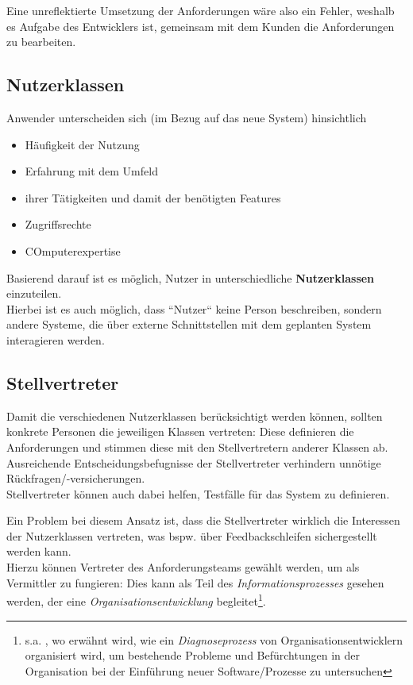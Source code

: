 \noindent
Eine unreflektierte Umsetzung der Anforderungen wäre also ein Fehler, weshalb es Aufgabe des Entwicklers ist, gemeinsam mit dem Kunden die Anforderungen zu bearbeiten.

\subsection*{Nutzerklassen}
Anwender unterscheiden sich (im Bezug auf das neue System) hinsichtlich

\begin{itemize}
    \item Häufigkeit der Nutzung
    \item Erfahrung mit dem Umfeld
    \item ihrer Tätigkeiten und damit der benötigten Features
    \item Zugriffsrechte
    \item COmputerexpertise
\end{itemize}

\noindent
Basierend darauf ist es möglich, Nutzer in unterschiedliche \textbf{Nutzerklassen} einzuteilen.\\
Hierbei ist es auch möglich, dass ``Nutzer`` keine Person beschreiben, sondern andere Systeme, die über externe Schnittstellen mit dem geplanten System interagieren werden.

\subsection*{Stellvertreter}
Damit die verschiedenen Nutzerklassen berücksichtigt werden können, sollten konkrete Personen die jeweiligen Klassen vertreten: Diese definieren die Anforderungen und stimmen diese mit den Stellvertretern anderer Klassen ab.\\
Ausreichende Entscheidungsbefugnisse der Stellvertreter verhindern unnötige Rückfragen/-versicherungen.\\
Stellvertreter können auch dabei helfen, Testfälle für das System zu definieren.

\noindent
Ein Problem bei diesem Ansatz ist, dass die Stellvertreter wirklich die Interessen der Nutzerklassen vertreten, was bspw. über Feedbackschleifen sichergestellt werden kann.\\
Hierzu können Vertreter des Anforderungsteams gewählt werden, um als Vermittler zu fungieren: Dies kann als Teil des \textit{Informationsprozesses} gesehen werden, der eine \textit {Organisationsentwicklung} begleitet\footnote{s.a. \cite[53]{Wed09}, wo erwähnt wird, wie ein \textit{Diagnoseprozess} von Organisationsentwicklern organisiert wird, um bestehende Probleme und Befürchtungen in der Organisation bei der Einführung neuer Software/Prozesse zu untersuchen}.

